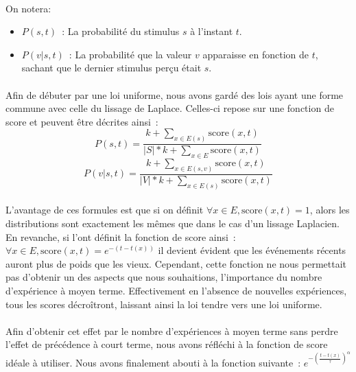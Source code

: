 \paragraph{}
On notera:
\begin{itemize}
\item $P(s, t)$~: La probabilité du stimulus $s$ à l'instant $t$.
\item $P(v|s, t)$~: La probabilité que la valeur $v$ apparaisse en fonction
      de $t$, sachant que le dernier stimulus perçu était $s$.
\end{itemize}
\paragraph{}
Afin de débuter par une loi uniforme, nous avons gardé des lois ayant une
forme commune avec celle du lissage de Laplace. Celles-ci repose sur une
fonction de score et peuvent être décrites ainsi~:
$$P(s,t) = \frac{k + \sum\limits_{x \in E(s)} \mathrm{score}(x, t)}
                {|S| * k + \sum\limits_{x \in E} \mathrm{score}(x, t)}$$
$$P(v| s, t) = \frac{k + \sum\limits_{x \in E(s, v)} \mathrm{score}(x, t)}
                {|V| * k + \sum\limits_{x \in E(s)} \mathrm{score}(x, t)}$$

\paragraph{}
L'avantage de ces formules est que si on définit
$\forall x \in E, \mathrm{score}(x, t) = 1$, alors les distributions sont
exactement les mêmes que dans le cas d'un lissage Laplacien. En revanche, si
l'ont définit la fonction de score ainsi~:
$\forall x \in E, \mathrm{score}(x, t) = e^{-(t - t(x))}$ il devient évident que
les événements récents auront plus de poids que les vieux. Cependant, cette
fonction ne nous permettait pas d'obtenir un des aspects que nous souhaitions,
l'importance du nombre d'expérience à moyen terme. Effectivement en l'absence
de nouvelles expériences, tous les scores décroîtront, laissant ainsi la loi
tendre vers une loi uniforme.

\paragraph{}
Afin d'obtenir cet effet par le nombre d'expériences à moyen terme sans perdre
l'effet de précédence à court terme, nous avons réfléchi à la fonction de
score idéale à utiliser. Nous avons finalement abouti à la fonction suivante~:
$e^{-(\frac{t-t(x)}{\tau})^{\alpha}}$

